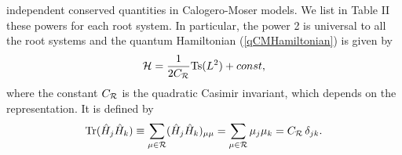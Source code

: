 \documentclass[a4paper,12pt]{article}
\begin{document}
independent conserved quantities
in Calogero-Moser models. We list in Table II these powers for each root
system.
In particular, the power 2 is universal to all the root systems and
the quantum Hamiltonian (\ref{qCMHamiltonian}) is given by
\begin{equation}
   {\cal H} = {1\over {2 C_{\cal R}}}\mbox{Ts}(L^{2}) +
   const,
   \label{L2Ham}
\end{equation}
where the constant \(C_{\cal R}\) is the quadratic Casimir invariant, which
depends on the
 representation. It is
defined by
\begin{equation}
   \mbox{Tr}(\hat{H}_{j}\hat{H}_{k})
   \equiv\sum_{\mu\in{\cal R}}(\hat{H}_{j}\hat{H}_{k})_{\mu\mu}
   =\sum_{\mu\in{\cal R}}\mu_{j}\mu_{k}
   =C_{\cal R}\,\delta_{jk}.
\end{equation}
\end{document}
